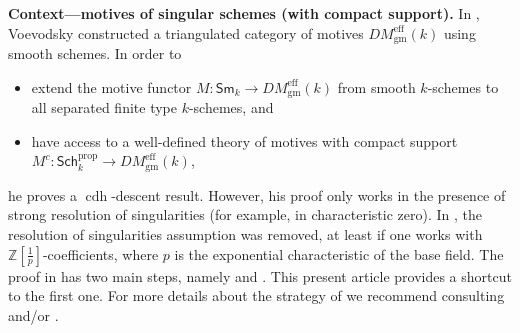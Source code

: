 \documentclass[10pt]{amsart}
\theoremstyle{definition}
\newcommand{\ZZ}{\mathbb{Z}}
\newcommand{\Sm}{\mathsf{Sm}}
\newcommand{\Sch}{\mathsf{Sch}}
\newcommand{\eff}{{\operatorname{eff}}}
\newcommand{\gm}{{\operatorname{gm}}}
\newcommand{\proper}{{\operatorname{prop}}}
\newcommand{\cdh}{{{\operatorname{cdh}}}}
\begin{document}

\textbf{Context---motives of singular schemes (with compact support).} %
%
In \cite{Voe00}, Voevodsky constructed a triangulated category of motives $DM^\eff_\gm(k)$ using smooth schemes. In order to 
 \begin{itemize}
  \item extend the motive functor $M: \Sm_k {\to} DM^\eff_\gm(k)$ from smooth $k$-schemes to all separated finite type $k$-schemes, and 

  \item have access to a well-defined theory of motives with compact support $M^c: \Sch_k^{\proper} {\to} DM^\eff_\gm(k)$, %
\end{itemize}
he proves a $\cdh$-descent result. However, his proof only works in the presence of strong resolution of singularities (for example, in characteristic zero). In \cite{Kel17}, the resolution of singularities assumption was removed, at least if one works with $\ZZ[\tfrac{1}{p}]$-coefficients, where $p$ is the exponential characteristic of the base field. The proof in \cite{Kel17} has two main steps, namely \cite[Cor.2.5.4]{Kel17} and \cite[Thm.3.2.12]{Kel17}. This present article provides a shortcut to the first one. For more details about the strategy of \cite{Kel17} we recommend consulting \cite[Chap.1]{Kel17} and/or \cite[Chap.4]{Kel17}.
\end{document}
